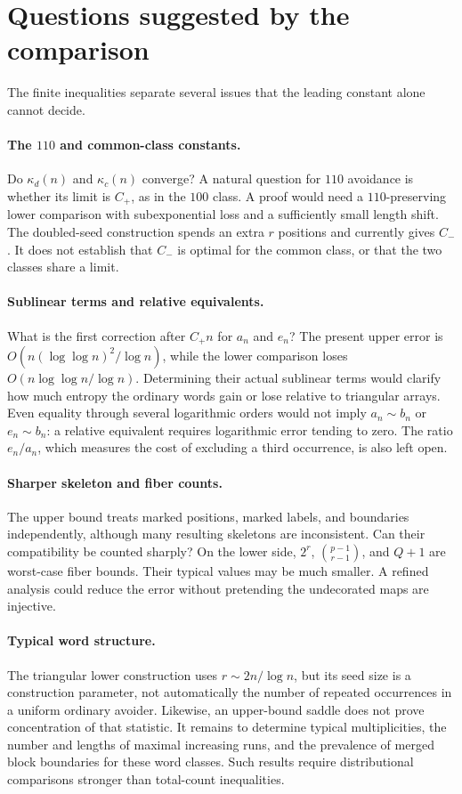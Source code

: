 \section{Questions suggested by the comparison}\label{sec:questions}
The finite inequalities separate several issues that the leading constant alone cannot decide.

\paragraph{The $110$ and common-class constants.}
Do $\kappa_d(n)$ and $\kappa_c(n)$ converge? A natural question for $110$ avoidance is whether its limit is $C_+$, as in the $100$ class. A proof would need a $110$-preserving lower comparison with subexponential loss and a sufficiently small length shift. The doubled-seed construction spends an extra $r$ positions and currently gives $C_-$. It does not establish that $C_-$ is optimal for the common class, or that the two classes share a limit.

\paragraph{Sublinear terms and relative equivalents.}
What is the first correction after $C_+n$ for $a_n$ and $e_n$? The present upper error is $O(n(\log\log n)^2/\log n)$, while the lower comparison loses $O(n\log\log n/\log n)$. Determining their actual sublinear terms would clarify how much entropy the ordinary words gain or lose relative to triangular arrays. Even equality through several logarithmic orders would not imply $a_n\sim b_n$ or $e_n\sim b_n$: a relative equivalent requires logarithmic error tending to zero. The ratio $e_n/a_n$, which measures the cost of excluding a third occurrence, is also left open.

\paragraph{Sharper skeleton and fiber counts.}
The upper bound treats marked positions, marked labels, and boundaries independently, although many resulting skeletons are inconsistent. Can their compatibility be counted sharply? On the lower side, $2^r$, $\binom{p-1}{r-1}$, and $Q+1$ are worst-case fiber bounds. Their typical values may be much smaller. A refined analysis could reduce the error without pretending the undecorated maps are injective.

\paragraph{Typical word structure.}
The triangular lower construction uses $r\sim2n/\log n$, but its seed size is a construction parameter, not automatically the number of repeated occurrences in a uniform ordinary avoider. Likewise, an upper-bound saddle does not prove concentration of that statistic. It remains to determine typical multiplicities, the number and lengths of maximal increasing runs, and the prevalence of merged block boundaries for these word classes. Such results require distributional comparisons stronger than total-count inequalities.

